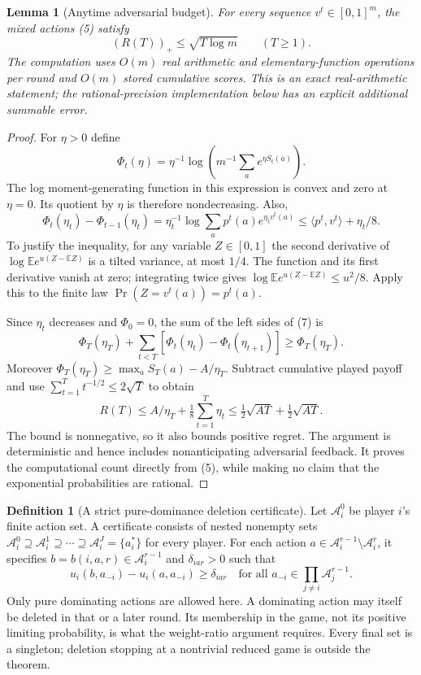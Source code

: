 \documentclass[11pt]{article}
\newtheorem{lemma}{Lemma}
\theoremstyle{definition}
\newtheorem{definition}{Definition}
\theoremstyle{remark}
\begin{document}
\begin{lemma}[Anytime adversarial budget]\label{lem:ew-budget}
For every sequence $v^t\in[0,1]^m$, the mixed actions (5) satisfy
\[
 (R(T))_+\leq\sqrt{T\log m}\qquad(T\geq1).             \tag{6}
\]
The computation uses $O(m)$ real arithmetic and elementary-function
operations per round and $O(m)$ stored cumulative scores. This is an exact
real-arithmetic statement; the rational-precision implementation below has
an explicit additional summable error.
\end{lemma}
\begin{proof}
For $\eta>0$ define
\[
 \Phi_t(\eta)=\eta^{-1}\log\left(m^{-1}
                 \sum_a e^{\eta S_t(a)}\right).
\]
The log moment-generating function in this expression is convex and zero
at $\eta=0$. Its quotient by $\eta$ is therefore nondecreasing. Also,
\[
 \Phi_t(\eta_t)-\Phi_{t-1}(\eta_t)
 =\eta_t^{-1}\log\sum_a p^t(a)e^{\eta_t v^t(a)}
 \leq\langle p^t,v^t\rangle+\eta_t/8.                 \tag{7}
\]
To justify the inequality, for any variable $Z\in[0,1]$ the second
derivative of $\log\mathbb E e^{u(Z-\mathbb EZ)}$ is a tilted variance,
at most $1/4$. The function and its first derivative vanish at zero;
integrating twice gives $\log\mathbb E e^{u(Z-\mathbb EZ)}\leq u^2/8$.
Apply this to the finite law $\Pr(Z=v^t(a))=p^t(a)$.

Since $\eta_t$ decreases and $\Phi_0=0$, the sum of the left sides of
(7) is
\[
 \Phi_T(\eta_T)+\sum_{t<T}
       [\Phi_t(\eta_t)-\Phi_t(\eta_{t+1})]
 \geq\Phi_T(\eta_T).
\]
Moreover $\Phi_T(\eta_T)\geq\max_a S_T(a)-A/\eta_T$.
Subtract cumulative played payoff and use
$\sum_{t=1}^Tt^{-1/2}\leq2\sqrt T$ to obtain
\[
 R(T)\leq A/\eta_T+\tfrac18\sum_{t=1}^T\eta_t
 \leq\tfrac12\sqrt{AT}+\tfrac12\sqrt{AT}.
\]
The bound is nonnegative, so it also bounds positive regret. The argument
is deterministic and hence includes nonanticipating adversarial feedback.
It proves the computational count directly from (5), while making no
claim that the exponential probabilities are rational.
\end{proof}

\begin{definition}[A strict pure-dominance deletion certificate]
Let $\mathcal A_i^0$ be player $i$'s finite action set. A certificate consists
of nested nonempty sets
$\mathcal A_i^0\supseteq\mathcal A_i^1\supseteq\cdots
\supseteq\mathcal A_i^J=\{a_i^*\}$ for every player. For each action
$a\in\mathcal A_i^{r-1}\setminus\mathcal A_i^r$, it specifies
$b=b(i,a,r)\in\mathcal A_i^{r-1}$ and $\delta_{iar}>0$ such that
\[
 u_i(b,a_{-i})-u_i(a,a_{-i})\geq\delta_{iar}
 \quad\text{for all }a_{-i}\in\prod_{j\ne i}\mathcal A_j^{r-1}.
                                                        \tag{8}
\]
Only pure dominating actions are allowed here. A dominating action may
itself be deleted in that or a later round. Its membership in the game,
not its positive limiting probability, is what the weight-ratio argument
requires. Every final set is a singleton; deletion stopping at a nontrivial
reduced game is outside the theorem.
\end{definition}
\end{document}
